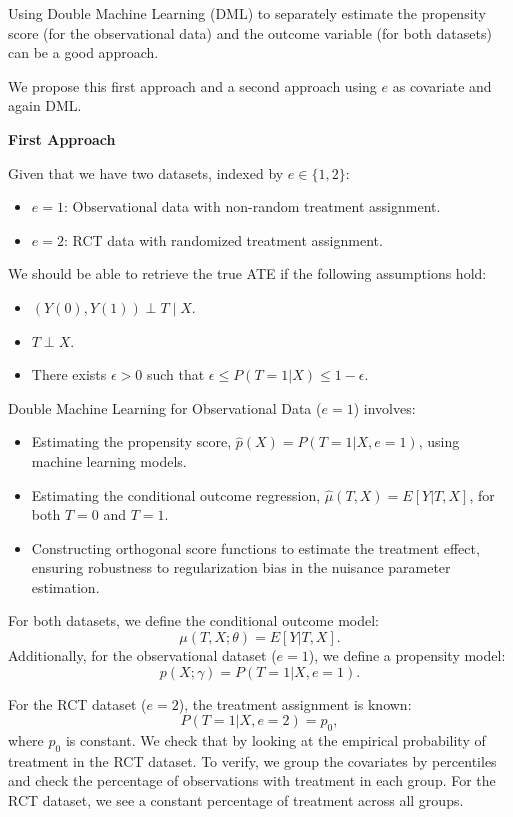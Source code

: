 \documentclass{article}
\begin{document}
Using Double Machine Learning (DML) to separately estimate the propensity score (for the observational data) and the outcome variable (for both datasets) can be a good approach.

We propose this first approach and a second approach using $e$ as covariate and again DML.

\textbf{First Approach}

Given that we have two datasets, indexed by \( e \in \{1, 2\} \):
\begin{itemize}
    \item \( e = 1 \): Observational data with non-random treatment assignment.
    \item \( e = 2 \): RCT data with randomized treatment assignment.
\end{itemize}

We should be able to retrieve the true ATE if the following assumptions hold:

\begin{itemize}
    \item {} \((Y(0), Y(1)) \perp T \mid X\).
    \item {} \( T \perp X \).
    \item {} There exists \( \epsilon > 0 \) such that \( \epsilon \leq P(T=1|X) \leq 1-\epsilon \).
\end{itemize}


Double Machine Learning for Observational Data (\( e=1 \)) involves:

\begin{itemize}
    \item Estimating the propensity score, \( \hat{p}(X) = P(T=1|X, e=1) \), using machine learning models.
    \item Estimating the conditional outcome regression, \( \hat{\mu}(T, X) = E[Y | T, X] \), for both \( T=0 \) and \( T=1 \).
    \item Constructing orthogonal score functions to estimate the treatment effect, ensuring robustness to regularization bias in the nuisance parameter estimation.
\end{itemize}

For both datasets, we define the conditional outcome model:
\[
\mu(T, X; \theta) = E[Y | T, X].
\]
Additionally, for the observational dataset (\( e=1 \)), we define a propensity model:
\[
p(X; \gamma) = P(T=1 | X, e=1).
\]

For the RCT dataset (\( e=2 \)), the treatment assignment is known:
\[
P(T=1 | X, e=2) = p_0,
\]
where \( p_0 \) is constant. We check that by looking at the empirical probability of treatment in the RCT dataset. To verify, we group the covariates by percentiles and check the percentage of observations with treatment in each group. For the RCT dataset, we see a constant percentage of treatment across all groups.
\end{document}
